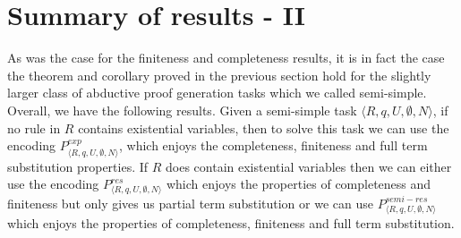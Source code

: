 \section{Summary of results - II}
As was the case for the finiteness and completeness results, it is in fact the case the theorem and corollary proved in the previous section hold for the slightly larger class of abductive proof generation tasks which we called semi-simple. Overall, we have the following results. Given a semi-simple task $\langle R,q,U,\emptyset,N\rangle$, if no rule in $R$ contains existential variables, then to solve this task we can use the encoding $P_{\langle R,q,U,\emptyset,N\rangle}^{exp}$, which enjoys the completeness, finiteness and full term substitution properties. If $R$ does contain existential variables then we can either use the encoding $P_{\langle R,q,U,\emptyset,N\rangle}^{res}$ which enjoys the properties of completeness and finiteness but only gives us partial term substitution or we can use $P_{\langle R,q,U,\emptyset,N\rangle}^{semi-res}$ which enjoys the properties of completeness, finiteness and full term substitution. 



